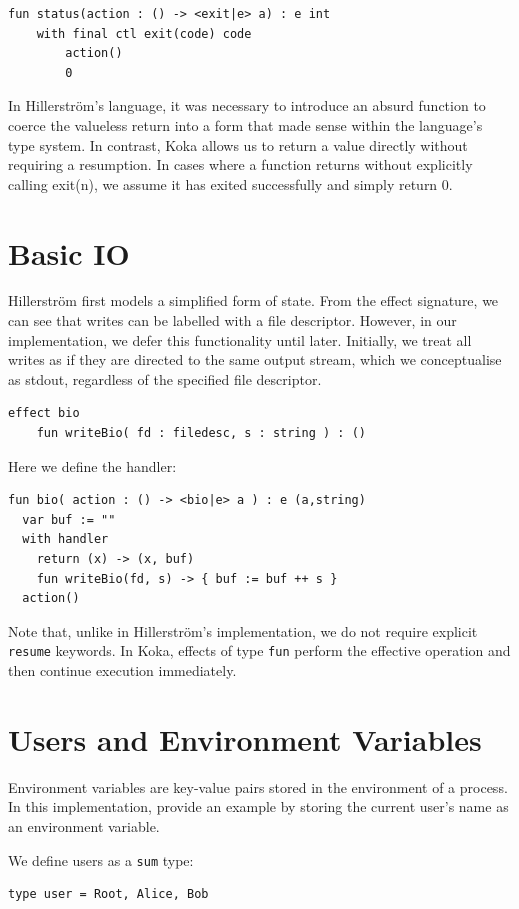 \documentclass[logo,bsc,singlespacing,parskip]{infthesis}
\begin{document}
\begin{lstlisting}
fun status(action : () -> <exit|e> a) : e int
    with final ctl exit(code) code
        action()
        0
\end{lstlisting}
In Hillerström’s language, it was necessary to introduce an absurd function to coerce the valueless return into a form that made sense within the language’s type system. In contrast, Koka allows us to return a value directly without requiring a resumption. In cases where a function returns without explicitly calling exit(n), we assume it has exited successfully and simply return 0.

\section{Basic IO}
Hillerström first models a simplified form of state. From the effect signature, we can see that writes can be labelled with a file descriptor. However, in our implementation, we defer this functionality until later. Initially, we treat all writes as if they are directed to the same output stream, which we conceptualise as stdout, regardless of the specified file descriptor.

\begin{lstlisting}
effect bio
    fun writeBio( fd : filedesc, s : string ) : ()
\end{lstlisting}
\vspace{1em}
Here we define the handler:

\begin{lstlisting}
fun bio( action : () -> <bio|e> a ) : e (a,string)
  var buf := ""    
  with handler
    return (x) -> (x, buf)
    fun writeBio(fd, s) -> { buf := buf ++ s }
  action()
\end{lstlisting}

Note that, unlike in Hillerström’s implementation, we do not require explicit \lstinline{resume} keywords. In Koka, effects of type \lstinline{fun} perform the effective operation and then continue execution immediately.

\section{Users and Environment Variables}
Environment variables are key-value pairs stored in the environment of a process. In this implementation, provide an example by storing the current user's name as an environment variable.

We define users as a \lstinline{sum} type:
\begin{lstlisting}
type user = Root, Alice, Bob
\end{lstlisting}
\end{document}
